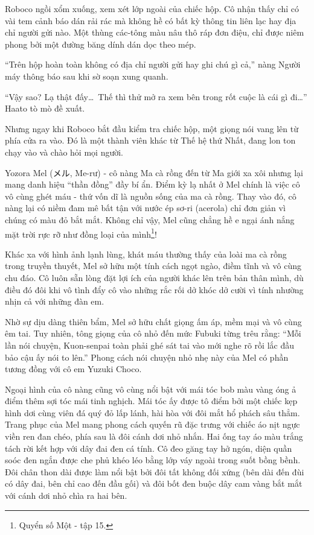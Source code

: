 \documentclass[../main.tex]{subfiles}
\begin{document}
Roboco ngồi xổm xuống, xem xét lớp ngoài của chiếc hộp. Cô nhận thấy chỉ có vài tem cảnh báo dán rải rác mà không hề có bất kỳ thông tin liên lạc hay địa chỉ người gửi nào. Một thùng các-tông màu nâu thô ráp đơn điệu, chỉ được niêm phong bởi một đường băng dính dán dọc theo mép.

``Trên hộp hoàn toàn không có địa chỉ người gửi hay ghi chú gì cả,'' nàng Người máy thông báo sau khi sờ soạn xung quanh.

``Vậy sao? Lạ thật đấy\dots\ Thế thì thử mở ra xem bên trong rốt cuộc là cái gì đi\dots'' Haato tò mò đề xuất.

Nhưng ngay khi Roboco bắt đầu kiểm tra chiếc hộp, một giọng nói vang lên từ phía cửa ra vào. Đó là một thành viên khác từ Thế hệ thứ Nhất, đang lon ton chạy vào và chào hỏi mọi người.

\chrint


Yozora Mel (メル,  Me-rư) - cô nàng Ma cà rồng đến từ Ma giới xa xôi nhưng lại mang danh hiệu ``thần đồng'' đầy bí ẩn. Điểm kỳ lạ nhất ở Mel chính là việc cô vô cùng ghét máu - thứ vốn dĩ là nguồn sống của ma cà rồng. Thay vào đó, cô nàng lại có niềm đam mê bất tận với nước ép sơ-ri (acerola) chỉ đơn giản vì chúng có màu đỏ bắt mắt. Không chỉ vậy, Mel cũng chẳng hề e ngại ánh nắng mặt trời rực rỡ như đồng loại của mình\footnote{Quyển số Một - tập 15.}!

Khác xa với hình ảnh lạnh lùng, khát máu thường thấy của loài ma cà rồng trong truyền thuyết, Mel sở hữu một tính cách ngọt ngào, điềm tĩnh và vô cùng chu đáo. Cô luôn sẵn lòng đặt lợi ích của người khác lên trên bản thân mình, dù điều đó đôi khi vô tình đẩy cô vào những rắc rối dở khóc dở cười vì tính nhường nhịn cả với những đàn em.

Nhờ sự dịu dàng thiên bẩm, Mel sở hữu chất giọng ấm áp, mềm mại và vô cùng êm tai. Tuy nhiên, tông giọng của cô nhỏ đến mức Fubuki từng trêu rằng: ``Mỗi lần nói chuyện, Kuon-senpai toàn phải ghé sát tai vào mới nghe rõ rồi lắc đầu bảo cậu ấy nói to lên.'' Phong cách nói chuyện nhỏ nhẹ này của Mel có phần tương đồng với cô em Yuzuki Choco.

Ngoại hình của cô nàng cũng vô cùng nổi bật với mái tóc bob màu vàng óng ả điểm thêm sợi tóc mái tinh nghịch. Mái tóc ấy được tô điểm bởi một chiếc kẹp hình dơi cùng viên đá quý đỏ lấp lánh, hài hòa với đôi mắt hổ phách sâu thẳm. Trang phục của Mel mang phong cách quyến rũ đặc trưng với chiếc áo nịt ngực viền ren đan chéo, phía sau là đôi cánh dơi nhỏ nhắn. Hai ống tay áo màu trắng tách rời kết hợp với dây đai đen cá tính. Cô đeo găng tay hở ngón, diện quần soóc đen ngắn được che phủ khéo léo bằng lớp váy ngoài trong suốt bồng bềnh. Đôi chân thon dài được làm nổi bật bởi đôi tất không đối xứng (bên dài đến đùi có dây đai, bên chỉ cao đến đầu gối) và đôi bốt đen buộc dây cam vàng bắt mắt với cánh dơi nhỏ chìa ra hai bên.
\end{document}
